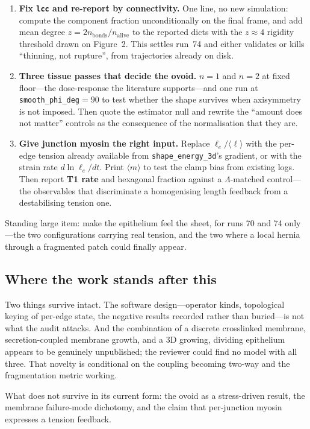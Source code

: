 \documentclass[10pt]{article}
\newcommand{\op}[1]{\texttt{#1}}
\begin{document}
\begin{enumerate}
\item \textbf{Fix \texttt{lcc} and re-report by connectivity.} One line, no new simulation: compute the
component fraction unconditionally on the final frame, and add mean degree $z=2n_{\text{bonds}}/n_{\text{alive}}$
to the reported dicts with the $z\approx4$ rigidity threshold drawn on Figure~2. This settles run~74 and
either validates or kills ``thinning, not rupture'', from trajectories already on disk.
\item \textbf{Three tissue passes that decide the ovoid.} $n=1$ and $n=2$ at fixed floor---the
dose-response the literature supports---and one run at \texttt{smooth\_phi\_deg}$=90$ to test whether the
shape survives when axisymmetry is not imposed. Then quote the estimator null and rewrite the
``amount does not matter'' controls as the consequence of the normalisation that they are.
\item \textbf{Give junction myosin the right input.} Replace $\ell_e/\langle\ell\rangle$ with the per-edge
tension already available from \op{shape\_energy\_3d}'s gradient, or with the strain rate
$d\ln\ell_e/dt$. Print $\langle m\rangle$ to test the clamp bias from existing logs. Then report
\textbf{T1 rate} and hexagonal fraction against a $\Lambda$-matched control---the observables that
discriminate a homogenising length feedback from a destabilising tension one.
\end{enumerate}

Standing large item: make the epithelium feel the sheet, for runs 70 and 74 only---the two configurations
carrying real tension, and the two where a local hernia through a fragmented patch could finally appear.

\subsection*{Where the work stands after this}

Two things survive intact. The software design---operator kinds, topological keying of per-edge state,
the negative results recorded rather than buried---is not what the audit attacks. And the combination of
a discrete crosslinked membrane, secretion-coupled membrane growth, and a 3D growing, dividing epithelium
appears to be genuinely unpublished; the reviewer could find no model with all three. That novelty is
conditional on the coupling becoming two-way and the fragmentation metric working.

What does not survive in its current form: the ovoid as a stress-driven result, the membrane failure-mode
dichotomy, and the claim that per-junction myosin expresses a tension feedback.
\end{document}
